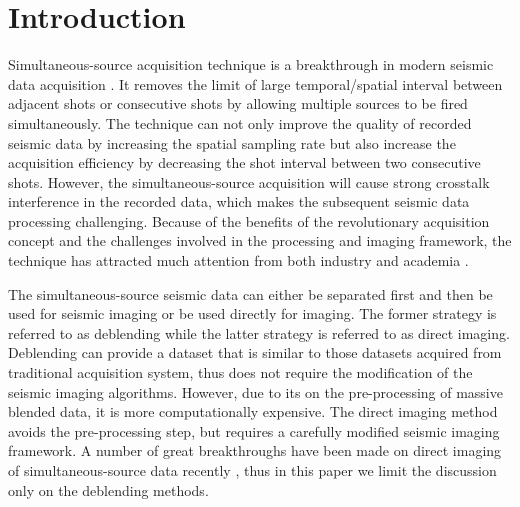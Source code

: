 \section{Introduction}
Simultaneous-source acquisition technique is a breakthrough in modern seismic data acquisition \cite[]{beasleycj2008,berkhout2008,abma2009,beasley2012,berkhout2012,wapenaark2012,qushan2015,abma2015,shaohuan2017jag,asgedom2017rough,zhang2017improving,kim2017efficient,shaohuan2017jag,wang2017building,wujuan2018jse1,amundsen2017multi}. It removes the limit of large temporal/spatial interval between adjacent shots or consecutive shots by allowing multiple sources to be fired simultaneously. The technique can not only improve the quality of recorded seismic data by increasing the spatial sampling rate but also increase the acquisition efficiency by decreasing the shot interval between two consecutive shots. However, the simultaneous-source acquisition will cause strong crosstalk interference in the recorded data, which makes the subsequent seismic data processing challenging. Because of the benefits of the revolutionary acquisition concept and the challenges involved in the processing and imaging framework, the technique has attracted much attention from both industry and academia \cite[]{mahdad2011,mahdad2012,panagiotis20122,arazthesis2012,qushan2014,sixuethesis2014,yanhui2014,sixue2015,halliday2015,benfengpocs,sixuethesis2014,sixue2015,yangkang2016irr5d,Robertsson2016Signal,andersson2017flawless,yatong2018gji,baimin2018jse2,yatong2018dbi,yatong2018jse}. 

The simultaneous-source seismic data can either be separated first and then be used for seismic imaging or be used directly for imaging. The former strategy is referred to as deblending while the latter strategy is referred to as direct imaging. Deblending can provide a dataset that is similar to those datasets acquired from  traditional acquisition system, thus does not require the modification of the  seismic imaging algorithms. However, due to its  on the pre-processing of massive blended data, it is more computationally expensive. The direct imaging method avoids the pre-processing step, but requires a carefully modified seismic imaging framework. A number of great breakthroughs have been made on direct imaging of simultaneous-source data recently \cite[]{verschuur2011,shuwei2016vscan,kui2016,kui20162,shaohuan2017,baimin2017jse1,yangkang2017lsrtm,wujuan2018cg1,baimin2018jse1,baimin2018cg,qingchen2018tgrs,qingchen2018gji,yangkang2019lsrtm}, thus in this paper we limit the discussion only on the deblending methods.


